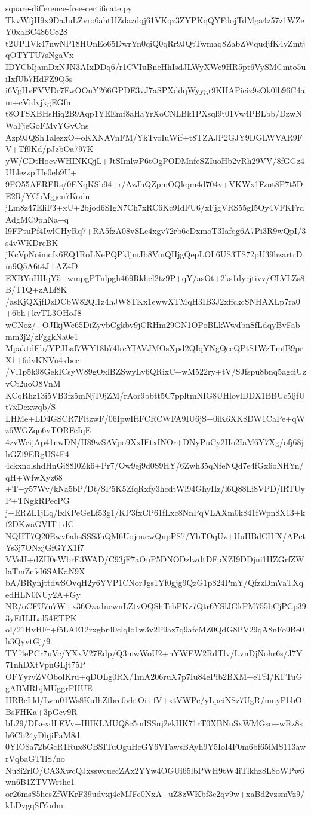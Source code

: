 \documentclass[11pt]{article}
\theoremstyle{definition}
\theoremstyle{remark}
\begin{document}
\begin{filecontents*}[overwrite]{square-difference-free-certificate.py}
TkvWfjH9x9DaJuLZvro6ahtUZdazdqj61VKqz3ZYPKqQYFdojTdMga4z57z1WZeY0xaBC486C828
t2UPlIVk47nwNP18HOnEo65DwrYn0qiQ0qRr9JQtTwmaq8ZabZWqudjfK4yZmtjqOTYTU7sNgaVx
IDYCbIjamDxNJN3AIxDDq6/r1CVIuBneHhIsdJLWyXWc9HR5pt6VySMCmto5uiIxfUb7HdFZ9Q5s
i6VgHvFVVDr7FwOOnY266GPDE3vJ7aSPXddqWyygr9KHAPiciz9sOk0lb96C4am+cVidvjkgEGfn
t8OTSXBHsHiq2B9Aqp1YEEmf8aHaYrXoCNLBk1PXsql9t01Vw4PBLbb/DzwNWaFjeGoFMvYGvCns
Azp9JQShTalezxO+oKXNAVnFM/YkTvoIuWif+t8TZAJP2GJY9DGLWVAR9FV+Tf9Kd/pJzbOa797K
yW/CDtHocvWHINKQjL+JtSImlwP6tOgPODMnfeSZIuoHb2vRh29VV/8fGGz4ULlezzpfHe0eb9U+
9FO55AERERs/0ENqKSb94+r/AzJhQZpmOQkqm4d704v+VKWx1Fznt8P7t5DE2R/YCbMgjcu7Kodn
jLm8z47EliF3+xU+2bjod6SIgN7Ch7xRC6Kc9IdFU6/xFjgVRS55gI5Oy4VFKFrdAdgMC9phNa+q
l9FPtuPf4IwlCHyRq7+RA5fzA08vSLe4xgv72rb6cDxmoT3Iafqg6A7Pi3R9wQpI/3s4vWKDrcBK
jKcVpNoimcfx6EQ1RoLNePQPkljmJb8VmQHjgQepLOL6US3TS72pU39hzartrDm9Q5A6t4J+AZ4D
EXBYnHHqY5+wmpgPTnlpgh469Rkhel2tz9P+qY/asOt+2ks1dyrjtivv/CLVLZs8B/T1Q+zALf8K
/asKjQXjfDzDCbW82Ql1z4hJW8TKx1ewwXTMqH3IB3J2xffckcSNHAXLp7ra0+6bh+kvTL3OHoJ8
wCNoz/+OJIkjWe65DiZyvbCgkbv9jCRHm29GN1OPoBLkWwdbnSfLdqyBvFabmm3j2/zFggkNa0e1
MpaktdFb/YPJLaf7WY18b74lrcYIAVJMOsXpd2QIqYNgQeeQPtS1WzTmfB9prX1+6dvKNVu4xbec
/Vl1p5k98GekICsyW89gOxlBZSwyLv6QRixC+wM522ry+tV/SJfspu8bnq5agciUzvCt2uoO8VnM
KCqRhz13i5VB3fz5mNjT0jZM/rAor9bbtt5C7ppltmNIG8UHlovlDDX1BBUc5ljfUt7xDexwqb/S
LHMe+LD4GSCR7FltzwF/06IpwIftFCRCWFA9IU6jS+0iK6XK8DW1CaPe+qWz6WGZqo6vTORFeIqE
4zvWeijAp41nwDN/H89wSAVpo9XxIEtxINOr+DNyPuCy2Ho2IaM6Y7Xg/ofj68jhGZf9ERgUS4F4
4ckxnolshdHnGi88I0Zk6+Pr7/Ow9ej9d0S9HY/6Zwh35qNfeNQd7e4fGx6oNHYn/qH+WfwXyz68
+T+y57Wv/kNa5bP/Dt/SP5K5ZiqRxfy3hcdtWl94GhyIIz/l6Q88Li8VPD/lRTUyP+TNgkRPecPG
j+ERZL1jEq/lxKPeGeLf53g1/KP3fxCP61fLxc8NnPqVLAXm0k841fWpn8X13+kf2DKwaGVIT+dC
NQHT7Q20Ewv6ahsSSS3hQM6UojouewQnpPS7/YbTOqUz+UuHBdCHfX/APctYs3j7ONxjGfGYX1f7
VVeH+dZH0eWbrE3WAD/C93jF7aOuP5DNODzlwdtDFpXZI9DDjni1HZGrfZWlaTmZcfsI6SAKaN9X
bA/BRynjttdwSOvqH2y6YVP1CNorJgs1Yf0gjg9QzG1p824PmY/QfzzDmVaTXqedHLN0NUy2A+Gy
NR/oCFU7u7W+x36OzadnewnLZtvOQShTrbPKz7Qtr6YSlJGkPM755bCjPCp393yEfHJLal54ETPK
oI/21HvHFr+f5LAE12rxgbr40clqIo1w3v2F9az7q9afcMZ0QdG8PV29qA8nFo9Be0h3QyvtGj/9
TYf4ePCr7uVc/YXxV27Edp/Q3mwWoU2+nYWEW2RdTlv/LvnDjNohr6s/J7Y71nhDXtVpnGLjt75P
OFYyrvZVObolKru+qDOLg0RX/1mA206ruX7p7Iu84ePib2BXM+eTf4/KFTuGgABMRbjMUggrPHUE
HRBcLld/Iwm01Ws8KuIhZfbre0vhtOi+fV+xtVWPe/yLpeiNSz7UgR/mnyPbbOBsFHKa+3pGcv9R
bL29/DfkexdLEVv+HlIKLMUQ8c5mISSnj2ekHK71rT0XBNuSxWMGso+wRz8sh6Cb24yDhjiPaM8d
0YIO8a72bGcR1Rux8CBSITuOguHcGY6VFawsBAyh9Y5IoI4F0m6bf65iMS113awrVqbaGT1lS/no
Nu8i2rlO/CA3XwcQJxsswcuecZAx2YYw4OGUi65lbPWH9tW4iTlkhz8L8oWPw6wn6B1ZTVWrthe1
or26msS5hesZfWKrF39udvxj4cMJFe0NxA+uZ8zWKbf3c2qv9w+xaBd2vzsmVz9/kLDvgqSfYodm

\end{filecontents*}
\end{document}
